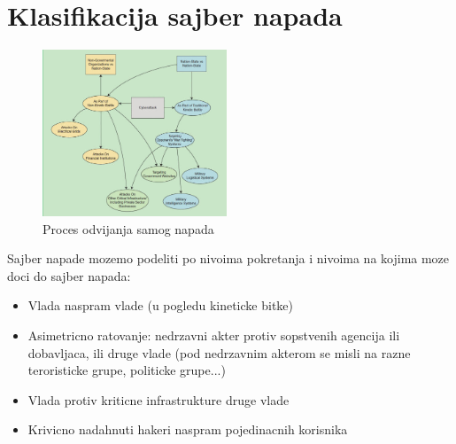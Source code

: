 \documentclass[a4paper]{article}
\begin{document}
{\section{Klasifikacija sajber napada}
\label{sec:naslovN}

\begin{figure}[h!]
  \centering
  \begin{center}
  \includegraphics[width=55mm]{proces.jpg}
  \end{center}
  \caption{Proces odvijanja samog napada}
  \label{fig:vr1}
\end{figure}

Sajber napade mozemo podeliti po nivoima pokretanja i nivoima na kojima moze doci do sajber napada:
\begin{itemize}
    \item Vlada naspram vlade (u pogledu kineticke bitke)
    \item Asimetricno ratovanje: nedrzavni akter protiv sopstvenih agencija ili dobavljaca, ili druge vlade (pod nedrzavnim akterom se misli na razne teroristicke grupe, politicke grupe...)
    \item Vlada protiv kriticne infrastrukture druge vlade
    \item  Krivicno nadahnuti hakeri naspram pojedinacnih korisnika
\end{itemize}

}
\end{document}
